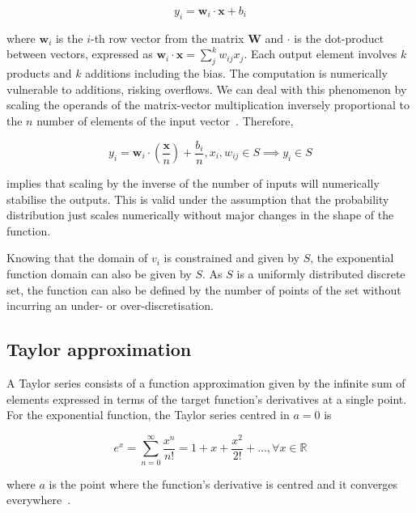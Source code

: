 \documentclass[conference]{IEEEtran}
\begin{document}
\begin{equation}
    y_i = \mathbf{w}_i \cdot \mathbf{x} + b_i
\end{equation}

\noindent
where $\mathbf{w}_i$ is the $i$-th row vector from the matrix $\mathbf{W}$ and $\cdot$ is the dot-product between vectors, expressed as $\mathbf{w}_i \cdot \mathbf{x} = \sum_{j}^{k} w_{ij}x_j$. Each output element involves $k$ products and $k$ additions including the bias. The computation is numerically vulnerable to additions, risking overflows. We can deal with this phenomenon by scaling the operands of the matrix-vector multiplication inversely proportional to the $n$ number of elements of the input vector~\cite{dcas}. Therefore,

\begin{equation}
    y_i = \mathbf{w}_i \cdot \left(\frac{\mathbf{x}}{n}\right) + \frac{b_i}{n}, x_i, w_{ij} \in S \implies y_i \in S
\end{equation}

\noindent
implies that scaling by the inverse of the number of inputs will numerically stabilise the outputs. This is valid under the assumption that the probability distribution just scales numerically without major changes in the shape of the function.

Knowing that the domain of $v_i$ is constrained and given by $S$, the exponential function domain can also be given by $S$. As $S$ is a uniformly distributed discrete set, the function can also be defined by the number of points of the set without incurring an under- or over-discretisation.


\subsection{Taylor approximation}

A Taylor series consists of a function approximation given by the infinite sum of elements expressed in terms of the target function's derivatives at a single point. For the exponential function, the Taylor series centred in $a = 0$ is

\begin{equation}
    e^x = \sum_{n=0}^\infty \frac{x^n}{n!} = 1 + x + \frac{x^2}{2!} + \dots, \forall x \in \mathbb{R}
\end{equation}

\noindent
where $a$ is the point where the function's derivative is centred and it converges everywhere~\cite{taylor}.
\end{document}

